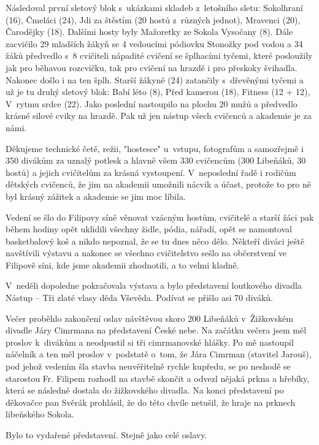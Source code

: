 \documentclass[11pt]{article}
\begin{document}
Následoval první sletový blok s~ukázkami skladeb z~letošního sletu: Sokolhraní (16), Čmeláci (24), Jdi za štěstím (20 hostů z~různých jednot), Mravenci (20), Čarodějky (18). Dalšími hosty byly Mažoretky ze Sokola Vysočany (8). Dále zacvičilo 29 mladších žákyň se 4 vedoucími pódiovku Stonožky pod vodou a 34 žáků předvedlo s~8 cvičiteli nápadité cvičení se šplhacími tyčemi, které posloužily jak pro běhavou rozcvičku, tak pro cvičení na hrazdě i pro přeskoky švihadla. Nakonec došlo i na ten šplh. Starší žákyně (24) zatančily s~dřevěnými tyčemi a už je tu druhý sletový blok: Babí léto (8), Před kamerou (18), Fitness (12 + 12), V~rytmu srdce (22). Jako poslední nastoupilo na plochu 20 mužů a předvedlo krásné silové cviky na hrazdě. Pak už jen nástup všech cvičenců a akademie je za námi.

Děkujeme technické četě, režii, "hostesce" u~vstupu, fotografům a samozřejmě i 350 divákům za uznalý potlesk a hlavně všem 330 cvičencům (300 Libeňáků, 30 hostů) a jejich cvičitelům za krásná vystoupení. V~neposlední řadě i rodičům dětských cvičenců, že jim na akademii umožnili nácvik a účast, protože to pro ně byl krásný zážitek a akademie se jim moc líbila. 

Vedení se šlo do Filipovy síně věnovat vzácným hostům, cvičitelé a starší žáci pak během hodiny opět uklidili všechny židle, pódia, nářadí, opět se namontoval basketbalový koš a nikdo nepoznal, že se tu dnes něco dělo. Někteří diváci ještě navštívili výstavu a nakonec se všechno cvičitelstvo sešlo na občerstvení ve Filipově síni, kde jsme akademii zhodnotili, a to velmi kladně.

V~neděli dopoledne pokračovala výstava a bylo představení loutkového divadla Nástup – Tři zlaté vlasy děda Vševěda. Podívat se přišlo asi 70 diváků.

Večer proběhlo zakončení oslav návštěvou skoro 200 Libeňáků v~Žižkovském divadle Járy Cimrmana na představení České nebe. Na začátku večera jsem měl proslov k~divákům a neodpustil si tři cimrmanovské hlášky. Po mě nastoupil náčelník a ten měl proslov v~podstatě o~tom, že Jára Cimrman (stavitel Jarouš), pod jehož vedením šla stavba neuvěřitelně rychle kupředu, se po neshodě se starostou Fr. Filipem rozhodl na stavbě skončit a odvezl nějaká prkna a hřebíky, která se následně dostala do žižkovského divadla. Na konci představení po děkovačce pan Svěrák prohlásil, že do této chvíle netušil, že hraje na prknech libeňského Sokola.

Bylo to vydařené představení. Stejně jako celé oslavy.
\end{document}
